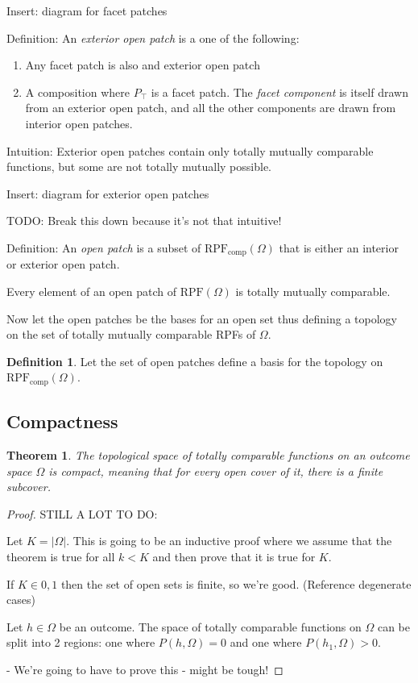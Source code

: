 \documentclass[twoside]{article}
\theoremstyle{plain}%
\newtheorem{theorem}{Theorem}[section]
\theoremstyle{definition}
\newtheorem{definition}{Definition}[section]
\theoremstyle{remark}
\begin{document}
Insert: diagram for facet patches

Definition: An \textit{exterior open patch} is a one of the following:

\begin{enumerate}
  \item Any facet patch is also and exterior open patch
  \item A composition where \(P_{\top}\) is a facet patch. The \textit{facet component} is itself drawn from an exterior open patch, and all the other components are drawn from interior open patches.
\end{enumerate}

Intuition: Exterior open patches contain only totally mutually comparable functions, but some are not totally mutually possible.

Insert: diagram for exterior open patches

TODO: Break this down because it's not that intuitive!

Definition: An \textit{open patch} is a subset of \(\text{RPF}_{\text{comp}}(\Omega)\) that is either an interior or exterior open patch.

Every element of an open patch of \(\text{RPF}(\Omega)\) is totally mutually comparable.

Now let the open patches be the bases for an open set thus defining a topology on the set of totally mutually comparable RPFs of \(\Omega\).

\begin{definition}
Let the set of open patches define a basis for the topology on \(\text{RPF}_{\text{comp}}(\Omega)\).
\end{definition}

\subsection{Compactness}

\begin{theorem}
The topological space of totally comparable functions on an outcome space \(\Omega\) is \textit{compact}, meaning that for every open cover of it, there is a finite subcover.
\end{theorem}

\begin{proof}
STILL A LOT TO DO:

Let \(K = |\Omega|\). This is going to be an inductive proof where we assume that the theorem is true for all \(k < K\) and then prove that it is true for \(K\).

If \(K \in {0, 1}\) then the set of open sets is finite, so we're good. (Reference degenerate cases)

Let \(h \in \Omega\) be an outcome. The space of totally comparable functions on \(\Omega\) can be split into 2 regions: one where \(P(h, \Omega) = 0\) and one where \(P(h_1, \Omega) > 0\).

- We're going to have to prove this - might be tough!
\end{proof}
\end{document}
